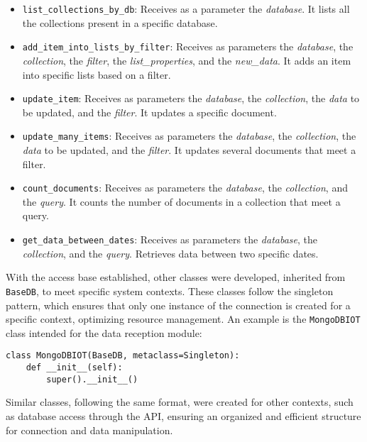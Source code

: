 \begin{itemize}
    \item \texttt{list\_collections\_by\_db}: Receives as a parameter the \textit{database}. It lists all the collections present in a specific database.
    
    \item \texttt{add\_item\_into\_lists\_by\_filter}: Receives as parameters the \textit{database}, the \textit{collection}, the \textit{filter}, the \textit{list\_properties}, and the \textit{new\_data}. It adds an item into specific lists based on a filter.
    
    \item \texttt{update\_item}: Receives as parameters the \textit{database}, the \textit{collection}, the \textit{data} to be updated, and the \textit{filter}. It updates a specific document.
    
    \item \texttt{update\_many\_items}: Receives as parameters the \textit{database}, the \textit{collection}, the \textit{data} to be updated, and the \textit{filter}. It updates several documents that meet a filter.
    
    \item \texttt{count\_documents}: Receives as parameters the \textit{database}, the \textit{collection}, and the \textit{query}. It counts the number of documents in a collection that meet a query.
    
    \item \texttt{get\_data\_between\_dates}: Receives as parameters the \textit{database}, the \textit{collection}, and the \textit{query}. Retrieves data between two specific dates.
\end{itemize}

With the access base established, other classes were developed, inherited from \texttt{BaseDB}, to meet specific system contexts. These classes follow the singleton pattern, which ensures that only one instance of the connection is created for a specific context, optimizing resource management. An example is the \texttt{MongoDBIOT} class intended for the data reception module:

\begin{Verbatim}[fontsize=\small, baselinestretch=0.6]
class MongoDBIOT(BaseDB, metaclass=Singleton):
    def __init__(self):
        super().__init__()
\end{Verbatim}

Similar classes, following the same format, were created for other contexts, such as database access through the \gls{API}, ensuring an organized and efficient structure for connection and data manipulation.

